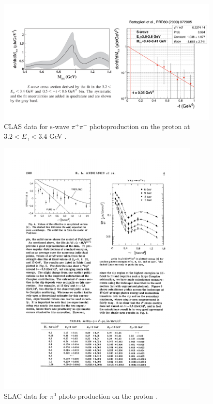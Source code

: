 \begin{figure}
\centering
\includegraphics[width=6in]{figures/f0_500.png}
\caption{CLAS data for s-wave $\pi^+ \pi^-$ photoproduction on the proton at $3.2 < E_\gamma < 3.4$ GeV \cite{Battaglieri:2009aa}. }
\label{f0_500}
\end{figure}

\begin{figure}
\centering
\includegraphics[width=4in]{figures/SLAC_data.pdf}
\caption{SLAC data for $\pi^0$ photo-production on the proton \cite{Anderson:1971}.}
\label{SLAC}
\end{figure}